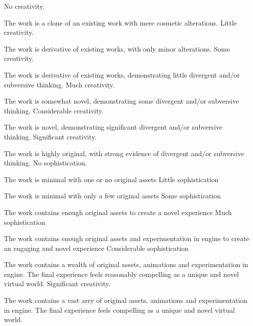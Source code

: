 \documentclass{../../fal_assignment}
\begin{document}
\begin{markingrubric}
%
        \grade\fail No creativity.
            \par The work is a clone of an existing work with mere cosmetic alterations.
        \grade Little creativity.
            \par The work is derivative of existing works, with only minor alterations.
        \grade Some creativity.
            \par The work is derivative of existing works, demonstrating little divergent and/or subversive thinking.
        \grade Much creativity.
            \par The work is somewhat novel, demonstrating some divergent and/or subversive thinking.
        \grade Considerable creativity.
            \par The work is novel, demonstrating significant divergent and/or subversive thinking.
        \grade Significant creativity.
            \par The work is highly original, with strong evidence of divergent and/or subversive thinking.
%
       \grade\fail No sophistication.
            \par The work is minimal with one or no original assets
        \grade Little sophistication
            \par The work is minimal with only a few original assets
        \grade Some sophistication
            \par The work contains enough original assets to create a novel experience
        \grade Much sophistication
            \par The work contains enough original assets and experimentation in engine to create an engaging and novel experience
        \grade Considerable sophistication
            \par The work contains a wealth of original assets, animations and experimentation in engine. The final experience feels reasonably compelling as a unique and novel virtual world. 
        \grade Significant creativity.
            \par The work contains a vast arry of original assets, animations and experimentation in engine. The final experience feels compelling as a unique and novel virtual world. 
%
    
%
\end{markingrubric}
\end{document}
